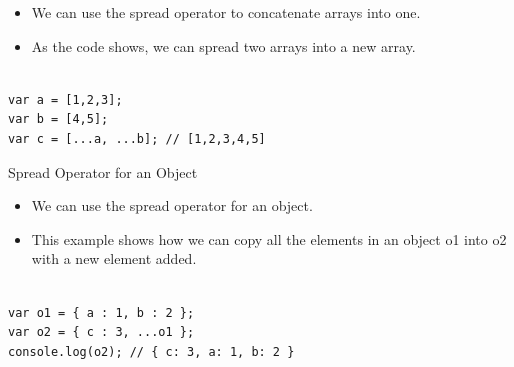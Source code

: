 \begin{frame}[fragile]{}

\begin{itemize}
	\item We can use the spread operator to concatenate arrays into one. 
	\item As the code shows, we can spread two arrays into a new array. 
\end{itemize}

\begin{Code}{}%
\begin{lstlisting}[firstnumber=1, label=glabels, xleftmargin=0pt, basicstyle=\scriptsize]% 

var a = [1,2,3];
var b = [4,5];
var c = [...a, ...b]; // [1,2,3,4,5]
\end{lstlisting}%
\end{Code}%
\end{frame}

\begin{frame}[fragile]{Spread Operator for an Object}

\begin{itemize}
	\item We can use the spread operator for an object. 
	\item This example shows how we can copy all the elements in an object o1 into o2 with a new element added. 
\end{itemize}

\begin{Code}{}%
\begin{lstlisting}[firstnumber=1, label=glabels, xleftmargin=0pt, basicstyle=\scriptsize]% 

var o1 = { a : 1, b : 2 };
var o2 = { c : 3, ...o1 };
console.log(o2); // { c: 3, a: 1, b: 2 }
\end{lstlisting}%
\end{Code}%

\end{frame}

